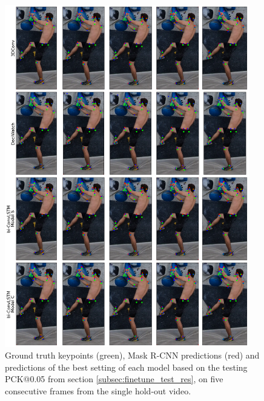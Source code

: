 \documentclass[./main.tex]{subfiles}
\begin{document}
\begin{figure}[h]
    \centering
    \includegraphics[width=0.95\textwidth]{./entities/predictions.png}
    \caption{Ground truth keypoints (green), Mask R-CNN predictions (red) and predictions of the best setting of each model based on the testing PCK@0.05 from section \ref{subsec:finetune_test_res}, on five consecutive frames from the single hold-out video.}
    \label{fig:predictions}
\end{figure}
\end{document}
